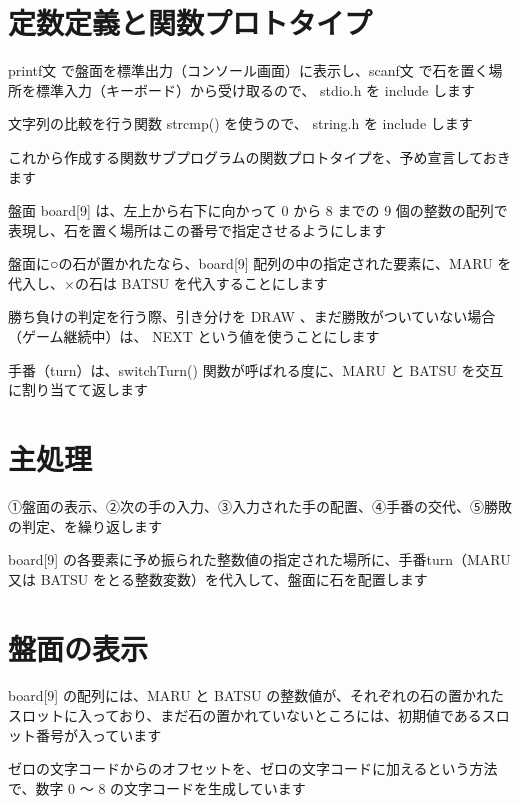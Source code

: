 \documentclass[uplatex,a4paper,11pt,oneside,openany]{jsbook}
\begin{document}
\section{定数定義と関数プロトタイプ}

printf文 で盤面を標準出力（コンソール画面）に表示し、scanf文 で石を置く場所を標準入力（キーボード）から受け取るので、 stdio.h を include します

文字列の比較を行う関数 strcmp() を使うので、 string.h を include します

これから作成する関数サブプログラムの関数プロトタイプを、予め宣言しておきます

盤面 board[9] は、左上から右下に向かって 0 から 8 までの 9 個の整数の配列で表現し、石を置く場所はこの番号で指定させるようにします

盤面に○の石が置かれたなら、board[9] 配列の中の指定された要素に、MARU を代入し、×の石は BATSU を代入することにします

勝ち負けの判定を行う際、引き分けを DRAW 、まだ勝敗がついていない場合（ゲーム継続中）は、 NEXT という値を使うことにします



手番（turn）は、switchTurn() 関数が呼ばれる度に、MARU と BATSU を交互に割り当てて返します



\section{主処理}

①盤面の表示、②次の手の入力、③入力された手の配置、④手番の交代、⑤勝敗の判定、を繰り返します

board[9] の各要素に予め振られた整数値の指定された場所に、手番turn（MARU 又は BATSU をとる整数変数）を代入して、盤面に石を配置します



\section{盤面の表示}

board[9] の配列には、MARU と BATSU の整数値が、それぞれの石の置かれたスロットに入っており、まだ石の置かれていないところには、初期値であるスロット番号が入っています

ゼロの文字コードからのオフセットを、ゼロの文字コードに加えるという方法で、数字 0 〜 8 の文字コードを生成しています
\end{document}
